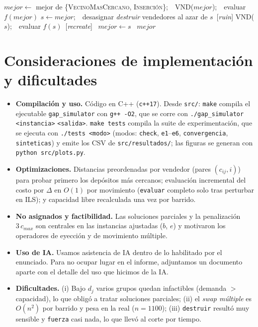 \documentclass[11pt,a4paper]{article}
\newcommand{\code}[1]{\texttt{#1}}
\begin{document}
\begin{algorithm}[H]
\caption{Metaheurística: LNS (Large Neighborhood Search)}
\begin{algorithmic}[1]
  \State $mejor \gets$ mejor de \{\textsc{VecinoMasCercano}, \textsc{Inserción}\};\ \ \textsc{VND}($mejor$);\ \ evaluar $f(mejor)$
    \State $s \gets mejor$;\ \ desasignar \textit{destruir} vendedores al azar de $s$\ \small{[\textit{ruin}]}
    \State \textsc{VND}($s$);\ \ evaluar $f(s)$\ \small{[\textit{recreate}]}
    \ $mejor \gets s$\ \EndIf
  \EndWhile
  \State \Return $mejor$
\EndFunction
\end{algorithmic}
\end{algorithm}

\section{Consideraciones de implementación y dificultades}
\begin{itemize}
  \item \textbf{Compilación y uso.} Código en C++ (\code{c++17}). Desde \code{src/}: \code{make}
        compila el ejecutable \code{gap\_simulator} con \code{g++ -O2}, que se corre con
        \code{./gap\_simulator <instancia>} \code{<salida>}. \code{make tests} compila la suite de
        experimentación, que se ejecuta con \code{./tests <modo>} (modos: \code{check},
        \code{e1}--\code{e6}, \code{convergencia}, \code{sinteticas}) y emite los CSV de
        \code{src/resultados/}; las figuras se generan con \code{python src/plots.py}.
  \item \textbf{Optimizaciones.} Distancias preordenadas por vendedor (pares $(c_{ij},i)$) para
        probar primero los depósitos más cercanos; evaluación incremental del costo por $\Delta$
        en $O(1)$ por movimiento (\code{evaluar} completo solo tras perturbar en ILS); y capacidad
        libre recalculada una vez por barrido.
  \item \textbf{No asignados y factibilidad.} Las soluciones parciales y la penalización
        $3\,c_{max}$ son centrales en las instancias ajustadas ($b$, $e$) y motivaron los
        operadores de eyección y de movimiento múltiple.
  \item \textbf{Uso de IA.} Usamos asistencia de IA dentro de lo habilitado por el enunciado.
        Para no ocupar lugar en el informe, adjuntamos un documento aparte con el detalle del uso
        que hicimos de la IA.
  \item \textbf{Dificultades.} (i) Bajo $d_j$ varios grupos quedan infactibles (demanda $>$
        capacidad), lo que obligó a tratar soluciones parciales; (ii) el \emph{swap múltiple} es
        $O(n^2)$ por barrido y pesa en la real ($n=1100$); (iii) \code{destruir} resultó muy
        sensible y \code{fuerza} casi nada, lo que llevó al corte por tiempo.
\end{itemize}
\end{document}
